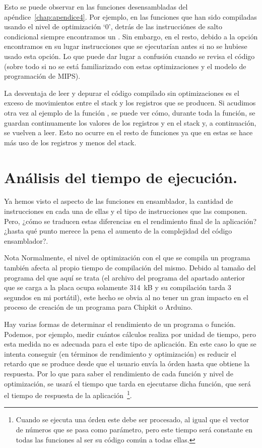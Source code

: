 Esto se puede observar en las funciones desensambladas del apéndice~\ref{chap:apendice4}. Por ejemplo, en las funciones que han sido compiladas usando el nivel de optimización `0', detrás de las instrucciónes de salto condicional siempre encontramos un . Sin embargo, en el resto, debido a la opción  encontramos en su lugar instrucciones que se ejecutarían antes si no se hubiese usado esta opción. Lo que puede dar lugar a confusión cuando se revisa el código (sobre todo si no se está familiarizado con estas optimizaciones y el modelo de programación de MIPS).

La desventaja de leer y depurar el código compilado sin optimizaciones es el exceso de movimientos entre el stack y los registros que se producen. Si acudimos otra vez al ejemplo de la función , se puede ver cómo, durante toda la función, se guardan continuamente los valores de los registros  y  en el stack y, a continuación, se vuelven a leer. Esto no ocurre en el resto de funciones ya que en estas se hace más uso de los registros y menos del stack.

\section{Análisis del tiempo de ejecución.} %
\label{sec:Análisis del tiempo de ejecución.}
Ya hemos visto el aspecto de las funciones en ensamblador, la cantidad de instrucciones en cada una de ellas y el tipo de instrucciones que las componen. Pero, ¿cómo se traducen estas diferencias en el rendimiento final de la aplicación? ¿hasta qué punto merece la pena el aumento de la complejidad del código ensamblador?.

\begin{mymdframed}{Nota}
	Normalmente, el nivel de optimización con el que se compila un programa también afecta al propio tiempo de compilación del mismo. Debido al tamaño del programa del que aquí se trata (el archivo del programa del apartado anterior que se carga a la placa ocupa solamente 314~kB y su compilación tarda 3 segundos en mi portátil), este hecho se obvia al no tener un gran impacto en el proceso de creación de un programa para Chipkit o Arduino.
\end{mymdframed}

Hay varias formas de determinar el rendimiento de un programa o función. Podemos, por ejemplo, medir cuántos cálculos realiza por unidad de tiempo, pero esta medida no es adecuada para el este tipo de aplicación. En este caso lo que se intenta conseguir (en términos de rendimiento y optimización) es reducir el retardo que se produce desde que el usuario envía la órden hasta que obtiene la respuesta. Por lo que para saber el rendimiento de cada función y nivel de optimización, se usará el tiempo que tarda en ejecutarse dicha función, que será el tiempo de respuesta de la aplicación~\footnote{Cuando se ejecuta una órden este debe ser procesado, al igual que el vector de números que se pasa como parámetro, pero este tiempo será constante en todas las funciones al ser su código común a todas ellas.}.

